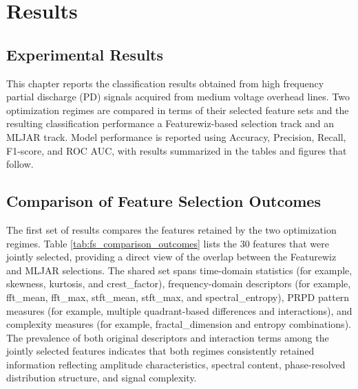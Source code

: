 \chapter{Results}

\section{Experimental Results}

This chapter reports the classification results obtained from high frequency partial discharge (PD) signals acquired from medium voltage overhead lines. Two optimization regimes are compared in terms of their selected feature sets and the resulting classification performance a Featurewiz-based selection track and an MLJAR track. Model performance is reported using Accuracy, Precision, Recall, F1-score, and ROC AUC, with results summarized in the tables and figures that follow.

\section{Comparison of Feature Selection Outcomes}

The first set of results compares the features retained by the two optimization regimes. Table \ref{tab:fs_comparison_outcomes} lists the 30 features that were jointly selected, providing a direct view of the overlap between the Featurewiz and MLJAR selections. The shared set spans time-domain statistics (for example, skewness, kurtosis, and crest\_factor), frequency-domain descriptors (for example, fft\_mean, fft\_max, stft\_mean, stft\_max, and spectral\_entropy), PRPD pattern measures (for example, multiple quadrant-based differences and interactions), and complexity measures (for example, fractal\_dimension and entropy combinations). The prevalence of both original descriptors and interaction terms among the jointly selected features indicates that both regimes consistently retained information reflecting amplitude characteristics, spectral content, phase-resolved distribution structure, and signal complexity.


